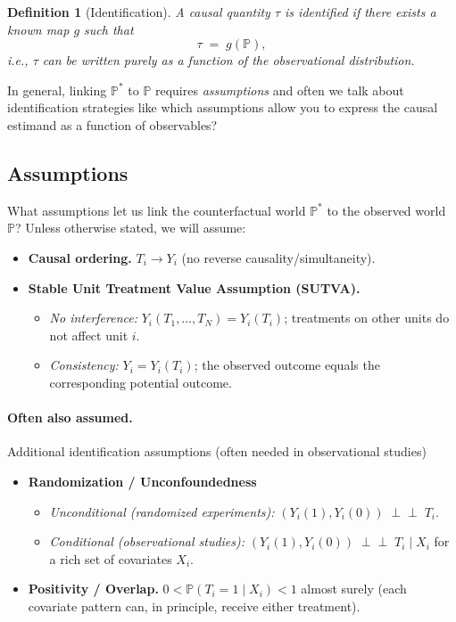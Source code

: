 \documentclass[11pt]{exam}
\theoremstyle{plain}
\newtheorem{definition}{Definition}
\begin{document}
\medskip

\begin{definition}[Identification]
A causal quantity $\tau$ is \emph{identified} if there exists a known map $g$ such that
\[
\tau \;=\; g(\mathbb{P}),
\]
i.e., $\tau$ can be written purely as a function of the observational distribution.
\end{definition}

In general, linking $\mathbb{P}^*$ to $\mathbb{P}$ requires \emph{assumptions} and often we talk about identification strategies like which assumptions allow you to express the causal estimand as a function of observables?



\subsection{Assumptions}
What assumptions let us link the counterfactual world $\mathbb{P}^*$ to the observed world $\mathbb{P}$?
Unless otherwise stated, we will assume:

\begin{itemize}[leftmargin=*]
  \item \textbf{Causal ordering.} $T_i \to Y_i$ (no reverse causality/simultaneity).
  \item \textbf{Stable Unit Treatment Value Assumption (SUTVA).}
    \begin{itemize}[noitemsep,topsep=2pt]
      \item \emph{No interference:} $Y_i(T_1,\dots,T_N)=Y_i(T_i)$; treatments on other units do not affect unit $i$.
      \item \emph{Consistency:} $Y_i = Y_i(T_i)$; the observed outcome equals the corresponding potential outcome.
    \end{itemize}
\end{itemize}

\paragraph{Often also assumed.}
Additional identification assumptions (often needed in observational studies)
\begin{itemize}[leftmargin=*]
  \item \textbf{Randomization / Unconfoundedness}
    \begin{itemize}[noitemsep,topsep=2pt]
      \item \emph{Unconditional (randomized experiments):} $(Y_i(1),Y_i(0)) \;\perp\!\!\!\perp\; T_i$.
      \item \emph{Conditional (observational studies):} $(Y_i(1),Y_i(0)) \;\perp\!\!\!\perp\; T_i \mid X_i$ for a rich set of covariates $X_i$.
    \end{itemize}
  \item \textbf{Positivity / Overlap.} $0<\mathbb{P}(T_i=1\mid X_i)<1$ almost surely (each covariate pattern can, in principle, receive either treatment).
\end{itemize}
\end{document}

